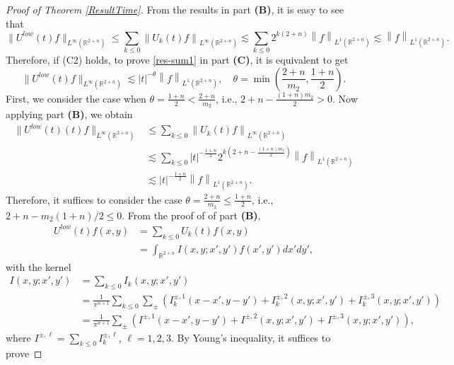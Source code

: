 \documentclass[a4paper,11pt, reqno]{amsart}
\numberwithin{equation}{section}
\theoremstyle{plain}
\theoremstyle{definition}
\theoremstyle{remark}
\begin{document}
\begin{proof}[Proof of Theorem \ref{ResultTime}]
From the results in part \textbf{(B)}, it is easy to see that
\begin{equation*}
\|U^{low}(t)f\|_{L^\infty(\mathbb{R}^{2+n})}\leq \sum_{k\leq 0}\left\|U_k(t)f\right\|_{L^\infty(\mathbb{R}^{2+n})}\lesssim \sum_{k\leq 0}2^{k(2+n)}\left\|f\right\|_{L^1(\mathbb{R}^{2+n})}\lesssim \left\|f\right\|_{L^1(\mathbb{R}^{2+n})}.
\end{equation*}
Therefore, if (C2) holds, to prove \eqref{res-sum1} in part \textbf{(C)}, it is equivalent to get
\begin{equation*}
\|U^{low}(t)f\|_{L^\infty(\mathbb{R}^{2+n})}\lesssim |t|^{-\theta}
\left\|f\right\|_{L^1(\mathbb{R}^{2+n})},\quad \theta=\min\left(\frac{2+n}{m_2},\frac{1+n}{2}\right).
\end{equation*}
First, we consider the case  when $\theta=\frac{1+n}{2}<\frac{2+n}{m_2}$, i.e., $2+n-\frac{(1+n)m_2}{2}>0$. Now applying part \textbf{(B)}, we obtain
 \begin{equation*}
\begin{aligned}
\|U^{low}(t)(t)f\|_{L^\infty(\mathbb{R}^{2+n})}&\leq \sum_{k\leq 0}\left\|U_k(t)f\right\|_{L^\infty(\mathbb{R}^{2+n})}\\
&\lesssim\sum_{k\leq  0}|t|^{-\frac{1+n}{2}}2^{k\left(2+n-\frac{(1+n)m_2}{2}\right)}\left\|f\right\|_{L^1(\mathbb{R}^{2+n})}\\
&\lesssim |t|^{-\frac{1+n}{2}}  \left\|f\right\|_{L^1(\mathbb{R}^{2+n})}.
\end{aligned}
\end{equation*}
Therefore, it suffices to consider the case $\theta=\frac{2+n}{m_2}\leq\frac{1+n}{2}$, i.e., $2+n-m_2(1+n)/2\leq 0$. From the proof of of part \textbf{(B)}, 
\begin{align*}\label{U2}
U^{low}(t)f(x,y)&=\sum_{k\leq 0}U_k(t)f(x,y)\\
&=\int_{\mathbb{R}^{2+n}}I(x,y;x',y')f(x',y')dx'dy',
\end{align*}
with the kernel
\begin{align*}
I(x,y;x',y')&=\sum_{k\leq 0}I_k(x,y;x',y')\\
            &=\frac{1}{\pi^{n+1}}\sum_{k\leq 0}\sum_{\pm}\left(I_k^{\pm,1}(x-x',y-y')+I_k^{\pm,2}(x,y;x',y')+I_k^{\pm,3}(x,y;x',y')\right)\\
            &=\frac{1}{\pi^{n+1}}\sum_{\pm}\left(I^{\pm,1}(x-x',y-y')+I^{\pm,2}(x,y;x',y')+I^{\pm,3}(x,y;x',y')\right),
\end{align*}
where $I^{\pm,\ell}=\sum_{k\leq 0}I_k^{\pm,\ell}$, $\ell=1,2,3$. By Young's inequality, it suffices to prove

\end{proof}
\end{document}
